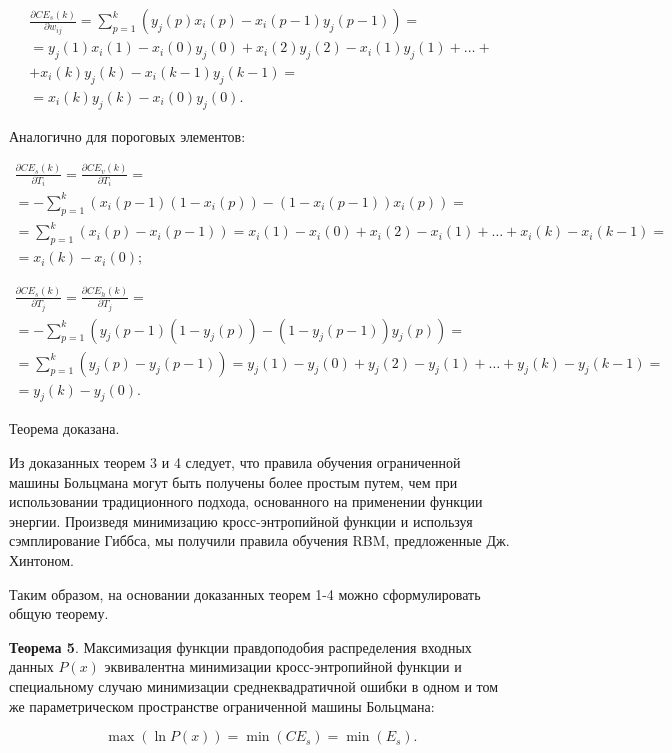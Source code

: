 \begin{multline*}
	\frac{\partial CE_s(k)}{\partial w_{ij}} = \sum_{p=1}^{k}(y_j(p)x_i(p)-x_i(p-1)y_j(p-1)) = \\ = y_j(1)x_i(1)-x_i(0)y_j(0)+x_i(2)y_j(2)-x_i(1)y_j(1)+\dots+\\+x_i(k)y_j(k)-x_i(k-1)y_j(k-1)=\\=x_i(k)y_j(k)-x_i(0)y_j(0).
\end{multline*}

Аналогично для пороговых элементов:

\begin{multline*}
	\frac{\partial CE_s(k)}{\partial T_i} = \frac{\partial CE_v(k)}{\partial T_i} =\\= -\sum_{p=1}^k (x_i(p-1)(1-x_i(p))-(1-x_i(p-1))x_i(p)) =\\= \sum_{p=1}^k (x_i(p) - x_i(p-1)) = x_i(1)-x_i(0)+x_i(2) - x_i(1) +\dots+x_i(k)-x_i(k-1) =\\= x_i(k)-x_i(0);
\end{multline*}

\begin{multline*}
	\frac{\partial CE_s(k)}{\partial T_j} = \frac{\partial CE_h(k)}{\partial T_j} =\\= -\sum_{p=1}^k (y_j(p-1)(1-y_j(p))-(1-y_j(p-1))y_j(p)) =\\= \sum_{p=1}^k (y_j(p) - y_j(p-1)) = y_j(1)-y_j(0)+y_j(2) - y_j(1) +\dots+y_j(k)-y_j(k-1) =\\= y_j(k)-y_j(0).
\end{multline*}

Теорема доказана.

Из доказанных теорем 3 и 4 следует, что правила обучения ограниченной машины Больцмана могут быть получены более простым путем, чем при использовании традиционного подхода, основанного на применении функции энергии. Произведя минимизацию кросс-энтропийной функции и используя сэмплирование Гиббса, мы получили правила обучения RBM, предложенные Дж. Хинтоном.

Таким образом, на основании доказанных теорем 1-4 можно сформулировать общую теорему.

\textbf{Теорема 5}. Максимизация функции правдоподобия распределения входных данных $P(x)$ эквивалентна минимизации кросс-энтропийной функции и специальному случаю минимизации среднеквадратичной ошибки в одном и том же параметрическом пространстве ограниченной машины Больцмана:

\begin{equation}
	\max(\ln P(x)) = \min(CE_s) = \min(E_s).
\end{equation}

